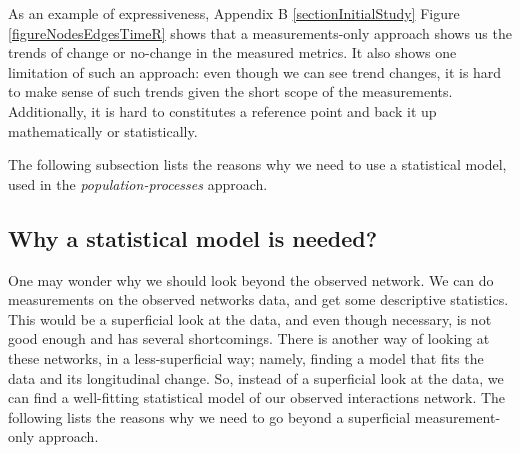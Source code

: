 \documentclass[12pt,letterpaper]{gthesis2}  %
\begin{document}
As an example of expressiveness, Appendix B \ref{sectionInitialStudy} Figure \ref{figureNodesEdgesTimeR} shows that a measurements-only approach shows us the trends of change or no-change in the measured metrics. It also shows one limitation of such an approach: even though we can see trend changes, it is hard to make sense of such trends given the short scope of the measurements. Additionally, it is hard to constitutes a reference point and back it up mathematically or statistically.

The following subsection lists the reasons why we need to use a statistical model, used in the \textit{population-processes} approach.

\subsection*{Why a statistical model is needed?}
One may wonder why we should look beyond the observed network. We can do measurements on the observed networks data, and get some descriptive statistics. This would be a superficial look at the data, and even though necessary, is not good enough and has several shortcomings. 
There is another way of looking at these networks, in a less-superficial way; namely, finding a model that fits the data and its longitudinal change. So, instead of a superficial look at the data, we can find a well-fitting statistical model of our observed interactions network. The following lists the reasons why we need to go beyond a superficial measurement-only approach. 
\end{document}
